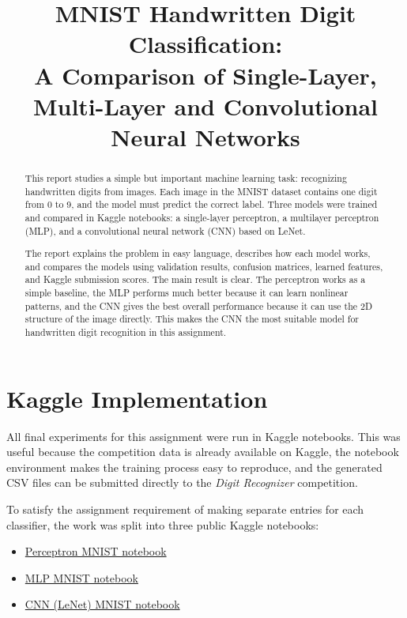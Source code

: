 \documentclass[11pt]{article}
\title{\textbf{MNIST Handwritten Digit Classification:\\
A Comparison of Single-Layer, Multi-Layer and Convolutional Neural Networks}}
\author{}
\date{}
\begin{document}
\maketitle

\begin{abstract}
This report studies a simple but important machine learning task: recognizing handwritten digits from images. Each image in the MNIST dataset contains one digit from 0 to 9, and the model must predict the correct label. Three models were trained and compared in Kaggle notebooks: a single-layer perceptron, a multilayer perceptron (MLP), and a convolutional neural network (CNN) based on LeNet.

The report explains the problem in easy language, describes how each model works, and compares the models using validation results, confusion matrices, learned features, and Kaggle submission scores. The main result is clear. The perceptron works as a simple baseline, the MLP performs much better because it can learn nonlinear patterns, and the CNN gives the best overall performance because it can use the 2D structure of the image directly. This makes the CNN the most suitable model for handwritten digit recognition in this assignment.
\end{abstract}

\section{Kaggle Implementation}

All final experiments for this assignment were run in Kaggle notebooks. This was useful because the competition data is already available on Kaggle, the notebook environment makes the training process easy to reproduce, and the generated CSV files can be submitted directly to the \emph{Digit Recognizer} competition.

To satisfy the assignment requirement of making separate entries for each classifier, the work was split into three public Kaggle notebooks:
\begin{itemize}
    \item \href{https://www.kaggle.com/code/zaeemnasir7/perceptron-mnist}{Perceptron MNIST notebook}
    \item \href{https://www.kaggle.com/code/zaeemnasir7/mlp-mnist}{MLP MNIST notebook}
    \item \href{https://www.kaggle.com/code/zaeemnasir7/cnn-lenet-mnist}{CNN (LeNet) MNIST notebook}
\end{itemize}
\end{document}
